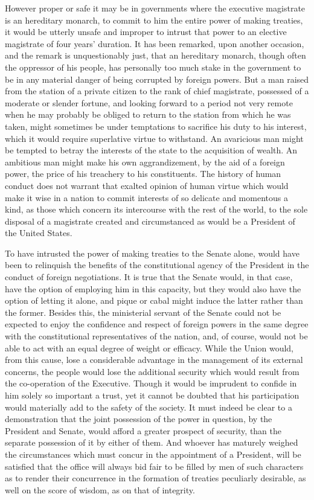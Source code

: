 However proper or safe it may be in governments where the executive magistrate is an hereditary monarch, to commit to him the entire power of making treaties, it would be utterly unsafe and improper to intrust that power to an elective magistrate of four years' duration. 
It has been remarked, upon another occasion, and the remark is unquestionably just, that an hereditary monarch, though often the oppressor of his people, has personally too much stake in the government to be in any material danger of being corrupted by foreign powers. 
But a man raised from the station of a private citizen to the rank of chief magistrate, possessed of a moderate or slender fortune, and looking forward to a period not very remote when he may probably be obliged to return to the station from which he was taken, might sometimes be under temptations to sacrifice his duty to his interest, which it would require superlative virtue to withstand. 
An avaricious man might be tempted to betray the interests of the state to the acquisition of wealth. 
An ambitious man might make his own aggrandizement, by the aid of a foreign power, the price of his treachery to his constituents. 
The history of human conduct does not warrant that exalted opinion of human virtue which would make it wise in a nation to commit interests of so delicate and momentous a kind, as those which concern its intercourse with the rest of the world, to the sole disposal of a magistrate created and circumstanced as would be a President of the United States.

To have intrusted the power of making treaties to the Senate alone, would have been to relinquish the benefits of the constitutional agency of the President in the conduct of foreign negotiations. 
It is true that the Senate would, in that case, have the option of employing him in this capacity, but they would also have the option of letting it alone, and pique or cabal might induce the latter rather than the former. 
Besides this, the ministerial servant of the Senate could not be expected to enjoy the confidence and respect of foreign powers in the same degree with the constitutional representatives of the nation, and, of course, would not be able to act with an equal degree of weight or efficacy. 
While the Union would, from this cause, lose a considerable advantage in the management of its external concerns, the people would lose the additional security which would result from the co-operation of the Executive. 
Though it would be imprudent to confide in him solely so important a trust, yet it cannot be doubted that his participation would materially add to the safety of the society. 
It must indeed be clear to a demonstration that the joint possession of the power in question, by the President and Senate, would afford a greater prospect of security, than the separate possession of it by either of them. 
And whoever has maturely weighed the circumstances which must concur in the appointment of a President, will be satisfied that the office will always bid fair to be filled by men of such characters as to render their concurrence in the formation of treaties peculiarly desirable, as well on the score of wisdom, as on that of integrity.

